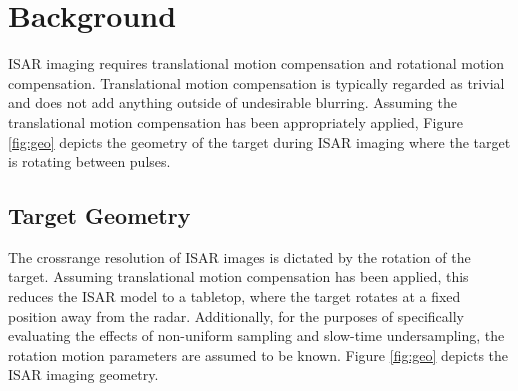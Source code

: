 \documentclass[journal]{IEEEtran}
\begin{document}
\section{Background}

ISAR imaging requires translational motion compensation and rotational motion compensation. Translational motion compensation is typically regarded as trivial and does not add anything outside of undesirable blurring. Assuming the translational motion compensation has been appropriately applied, Figure \ref{fig:geo} depicts the geometry of the target during ISAR imaging where the target is rotating between pulses.

\subsection{Target Geometry}

The crossrange resolution of ISAR images is dictated by the rotation of the target. Assuming translational motion compensation has been applied, this reduces the ISAR model to a tabletop, where the target rotates at a fixed position away from the radar. Additionally, for the purposes of specifically evaluating the effects of non-uniform sampling and slow-time undersampling, the rotation motion parameters are assumed to be known. Figure \ref{fig:geo} depicts the ISAR imaging geometry.
\end{document}
